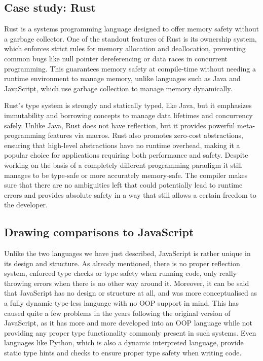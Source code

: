 \subsection{Case study: Rust}

Rust is a systems programming language designed to offer memory safety without a garbage collector. One of the standout features of Rust is its ownership system, which enforces strict rules for memory allocation and deallocation, preventing common bugs like null pointer dereferencing or data races in concurrent programming. This guarantees memory safety at compile-time without needing a runtime environment to manage memory, unlike languages such as Java and JavaScript, which use garbage collection to manage memory dynamically.

Rust's type system is strongly and statically typed, like Java, but it emphasizes immutability and borrowing concepts to manage data lifetimes and concurrency safely. Unlike Java, Rust does not have reflection, but it provides powerful meta-programming features via macros. Rust also promotes zero-cost abstractions, ensuring that high-level abstractions have no runtime overhead, making it a popular choice for applications requiring both performance and safety. Despite working on the basis of a completely different programming paradigm it still manages to be type-safe or more accurately memory-safe. The compiler makes sure that there are no ambiguities left that could potentially lead to runtime errors and provides absolute safety in a way that still allows a certain freedom to the developer.

\subsection{Drawing comparisons to JavaScript}

Unlike the two languages we have just described, JavaScript is rather unique in its design and structure. As already mentioned, there is no proper reflection system, enforced type checks or type safety when running code, only really throwing errors when there is no other way around it. Moreover, it can be said that JavaScript has no design or structure at all, and was more conceptualised as a fully dynamic type-less language with no OOP support in mind. This has caused quite a few problems in the years following the original version of JavaScript, as it has more and more developed into an OOP language while not providing any proper type functionality commonly present in such systems. Even languages like Python, which is also a dynamic interpreted language, provide static type hints and checks to ensure proper type safety when writing code.

